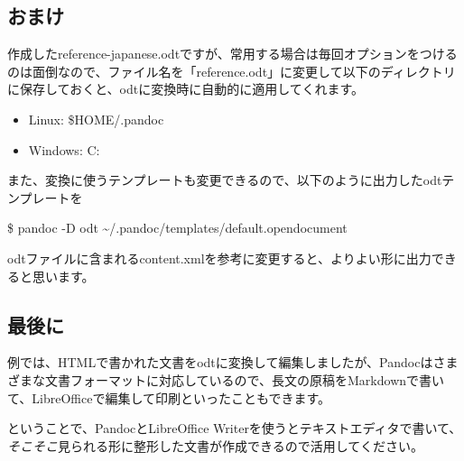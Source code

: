 \documentclass[]{article}
\providecommand{\tightlist}{%
  \setlength{\itemsep}{0pt}\setlength{\parskip}{0pt}}
\begin{document}
\subsection{おまけ}\label{ux304aux307eux3051}

作成したreference-japanese.odtですが、常用する場合は毎回オプションをつけるのは面倒なので、ファイル名を「reference.odt」に変更して以下のディレクトリに保存しておくと、odtに変換時に自動的に適用してくれます。

\begin{itemize}
\tightlist
\item
  Linux: \$HOME/.pandoc
\item
  Windows: C:
\end{itemize}

また、変換に使うテンプレートも変更できるので、以下のように出力したodtテンプレートを

\$ pandoc -D odt
\textasciitilde{}/.pandoc/templates/default.opendocument

odtファイルに含まれるcontent.xmlを参考に変更すると、よりよい形に出力できると思います。

\subsection{最後に}\label{ux6700ux5f8cux306b}

例では、HTMLで書かれた文書をodtに変換して編集しましたが、Pandocはさまざまな文書フォーマットに対応しているので、長文の原稿をMarkdownで書いて、LibreOfficeで編集して印刷といったこともできます。

ということで、PandocとLibreOffice
Writerを使うとテキストエディタで書いて、\emph{そこそこ}見られる形に整形した文書が作成できるので活用してください。
\end{document}
